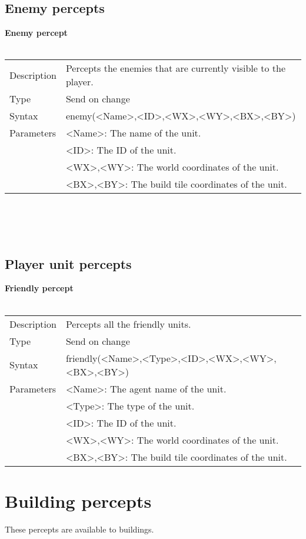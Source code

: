 \documentclass[english,11pt]{report}
\begin{document}
\subsection{Enemy percepts}
\textbf{Enemy percept}\\
\\
\begin{tabularx}{\textwidth}{lX}
 Description & Percepts the enemies that are currently visible to the player. \\
 Type & Send on change \\
 Syntax & enemy(<Name>,<ID>,<WX>,<WY>,<BX>,<BY>) \\
 Parameters &   <Name>: The name of the unit.\\
            &   <ID>: The ID of the unit.\\
            &   <WX>,<WY>: The world coordinates of the unit.\\
            &   <BX>,<BY>: The build tile coordinates of the unit.
\end{tabularx}\\
\\
\\

\subsection{Player unit percepts}
\textbf{Friendly percept}\\
\\
\begin{tabularx}{\textwidth}{lX}
 Description & Percepts all the friendly units. \\
 Type & Send on change \\
 Syntax & friendly(<Name>,<Type>,<ID>,<WX>,<WY>,<BX>,<BY>) \\
 Parameters &   <Name>: The agent name of the unit.\\
            &   <Type>: The type of the unit.\\
            &   <ID>: The ID of the unit.\\
            &   <WX>,<WY>: The world coordinates of the unit.\\
            &   <BX>,<BY>: The build tile coordinates of the unit.
\end{tabularx}

\newpage
\section{Building percepts}
These percepts are available to buildings.
\end{document}

